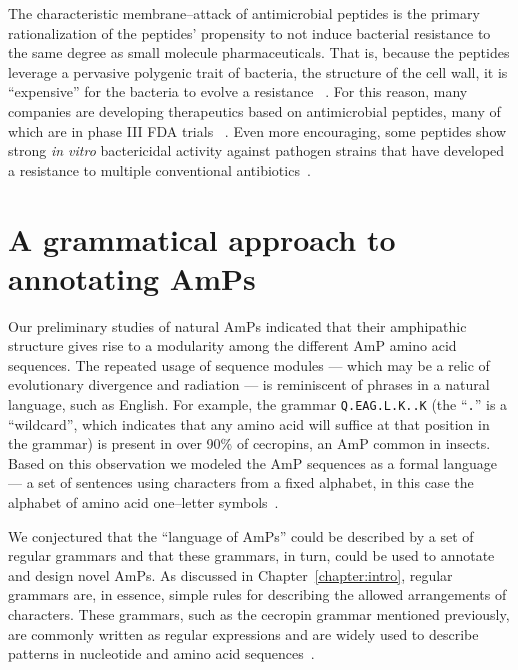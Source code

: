     The characteristic membrane--attack of
    antimicrobial peptides is the primary
    rationalization of the peptides' propensity to
    not induce bacterial resistance to the same
    degree as small molecule pharmaceuticals.
    That is, because the peptides leverage a
    pervasive polygenic trait of bacteria, the
    structure of the cell wall, it is ``expensive''
    for the bacteria to evolve a resistance
    ~\cite{zasloff2002antimicrobial,zasloff2002antimicrobialpeptides}.
    For this reason, many companies are developing
    therapeutics based on antimicrobial
    peptides, many of which are in phase III
    FDA trials ~\cite{hancock2002clinical}.
    Even more encouraging, some peptides show
    strong \emph{in vitro} bactericidal activity
    against pathogen strains that have developed
    a resistance to multiple conventional
    antibiotics~\cite{ge1999invitro,tiozzo1998wide,strom2003pharmacophore}.

\section{A grammatical approach to annotating
AmPs}\label{section:annotation}
    Our preliminary studies of natural AmPs indicated that their
    amphipathic structure gives rise to a modularity among the different
    AmP amino acid sequences.  The repeated usage of sequence modules ---
    which may be a relic of evolutionary divergence and radiation ---
    is reminiscent of phrases in a natural language, such as English.
    For example, the grammar \texttt{Q.EAG.L.K..K} (the ``\texttt{.}'' is
    a ``wildcard'', which indicates that any amino acid will suffice at
    that position in the grammar) is present in over 90\% of cecropins,
    an AmP common in insects.  Based on this observation we modeled
    the AmP sequences as a formal language --- a set of sentences using
    characters from a fixed alphabet, in this case the alphabet of amino
    acid one--letter symbols~\cite{jurafsky2000speech}.

    We conjectured that the ``language of AmPs'' could be described
    by a set of regular grammars and that these grammars, in turn, could be used
    to annotate and design novel AmPs.  As discussed in
    Chapter~\ref{chapter:intro},
    regular grammars are, in
    essence, simple rules for describing the allowed arrangements of
    characters.  These grammars, such as the cecropin grammar mentioned
    previously, are commonly written as regular expressions and are
    widely used to describe patterns in nucleotide and amino acid
    sequences~\cite{searls2002language,hofmann1999prosite}.

